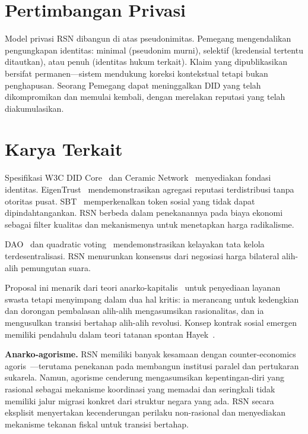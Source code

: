 \documentclass[11pt,a4paper,twocolumn]{article}
\begin{document}
\section{Pertimbangan Privasi}

Model privasi RSN dibangun di atas pseudonimitas. Pemegang mengendalikan pengungkapan identitas: minimal (pseudonim murni), selektif (kredensial tertentu ditautkan), atau penuh (identitas hukum terkait). Klaim yang dipublikasikan bersifat permanen---sistem mendukung koreksi kontekstual tetapi bukan penghapusan. Seorang Pemegang dapat meninggalkan DID yang telah dikompromikan dan memulai kembali, dengan merelakan reputasi yang telah diakumulasikan.

\section{Karya Terkait}

Spesifikasi W3C DID Core~\cite{did2022} dan Ceramic Network~\cite{ceramic2023} menyediakan fondasi identitas. EigenTrust~\cite{kamvar2003} mendemonstrasikan agregasi reputasi terdistribusi tanpa otoritas pusat. SBT~\cite{weyl2022} memperkenalkan token sosial yang tidak dapat dipindahtangankan. RSN berbeda dalam penekanannya pada biaya ekonomi sebagai filter kualitas dan mekanismenya untuk menetapkan harga radikalisme.

DAO~\cite{buterin2014} dan quadratic voting~\cite{buterin2019} mendemonstrasikan kelayakan tata kelola terdesentralisasi. RSN menurunkan konsensus dari negosiasi harga bilateral alih-alih pemungutan suara.

Proposal ini menarik dari teori anarko-kapitalis~\cite{rothbard1973,hoppe2001} untuk penyediaan layanan swasta tetapi menyimpang dalam dua hal kritis: ia merancang untuk kedengkian dan dorongan pembalasan alih-alih mengasumsikan rasionalitas, dan ia mengusulkan transisi bertahap alih-alih revolusi. Konsep kontrak sosial emergen memiliki pendahulu dalam teori tatanan spontan Hayek~\cite{hayek1973}.

\textbf{Anarko-agorisme.} RSN memiliki banyak kesamaan dengan counter-economics agoris~\cite{konkin2006}---terutama penekanan pada membangun institusi paralel dan pertukaran sukarela. Namun, agorisme cenderung mengasumsikan kepentingan-diri yang rasional sebagai mekanisme koordinasi yang memadai dan seringkali tidak memiliki jalur migrasi konkret dari struktur negara yang ada. RSN secara eksplisit menyertakan kecenderungan perilaku non-rasional dan menyediakan mekanisme tekanan fiskal untuk transisi bertahap.
\end{document}
